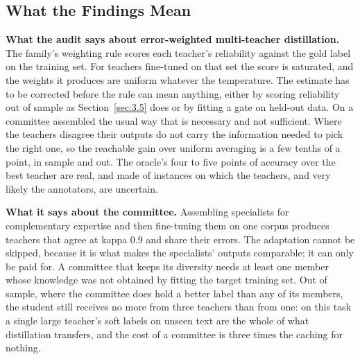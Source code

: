 \subsection{What the Findings Mean}
\label{sec:6.2}

\textbf{What the audit says about error-weighted multi-teacher distillation.} The family's weighting
rule scores each teacher's reliability against the gold label on the training set. For teachers
fine-tuned on that set the score is saturated, and the weights it produces are uniform whatever the
temperature. The estimate has to be corrected before the rule can mean anything, either by scoring
reliability out of sample as Section~\ref{sec:3.5} does or by fitting a gate on held-out data. On a
committee assembled the usual way that is necessary and not sufficient. Where the teachers disagree
their outputs do not carry the information needed to pick the right one, so the reachable gain over
uniform averaging is a few tenths of a point, in sample and out. The oracle's four to five points of
accuracy over the best teacher are real, and made of instances on which the teachers, and very
likely the annotators, are uncertain.

\textbf{What it says about the committee.} Assembling specialists for complementary expertise and
then fine-tuning them on one corpus produces teachers that agree at kappa 0.9 and share their
errors. The adaptation cannot be skipped, because it is what makes the specialists' outputs
comparable; it can only be paid for. A committee that keeps its diversity needs at least one member
whose knowledge was not obtained by fitting the target training set. Out of sample, where the
committee does hold a better label than any of its members, the student still receives no more from
three teachers than from one: on this task a single large teacher's soft labels on unseen text are
the whole of what distillation transfers, and the cost of a committee is three times the caching for
nothing.

